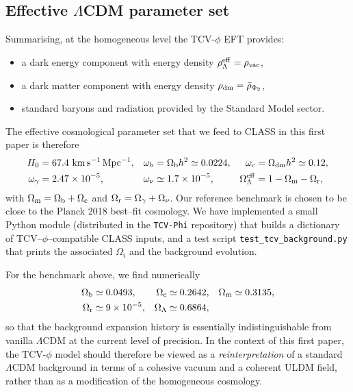 \documentclass[aps,prd,onecolumn,nofootinbib,superscriptaddress]{revtex4-2}
\newcommand{\Omb}{\Omega_{\rm b}}
\newcommand{\Omc}{\Omega_{\rm c}}
\newcommand{\Omm}{\Omega_{\rm m}}
\newcommand{\Oml}{\Omega_{\Lambda}}
\newcommand{\Omg}{\Omega_{\gamma}}
\newcommand{\Omr}{\Omega_{\rm r}}
\begin{document}
\subsection{Effective $\Lambda$CDM parameter set}

Summarising, at the homogeneous level the TCV-$\phi$ EFT provides:
\begin{itemize}[leftmargin=1.5em]
  \item a dark energy component with energy density $\rho_\Lambda^{\rm eff}=\rho_{\rm vac}$,
  \item a dark matter component with energy density $\rho_{\rm dm}=\bar\rho_{\Phi_2}$,
  \item standard baryons and radiation provided by the Standard Model sector.
\end{itemize}
The effective cosmological parameter set that we feed to CLASS in this first paper is therefore
\begin{align}
  H_0 &= 67.4~\mathrm{km\,s^{-1}\,Mpc^{-1}},
  &
  \omega_{\rm b} &= \Omega_{\rm b} h^2 \simeq 0.0224,
  &
  \omega_{\rm c} &= \Omega_{\rm dm} h^2 \simeq 0.12,
  \nonumber\\
  \omega_\gamma &= 2.47\times 10^{-5},
  &
  \omega_\nu &\simeq 1.7\times 10^{-5},
  &
  \Omega_\Lambda^{\rm eff} &= 1 - \Omega_{\rm m} - \Omega_{\rm r},
  \label{eq:theta-tcv}
\end{align}
with $\Omega_{\rm m}=\Omb+\Omc$ and $\Omega_{\rm r}=\Omg+\Omega_\nu$.
Our reference benchmark is chosen to be close to the Planck 2018 best--fit cosmology.
We have implemented a small Python module (distributed in the \texttt{TCV-Phi} repository) that builds a dictionary of TCV--$\phi$--compatible CLASS inputs, and a test script \texttt{test\_tcv\_background.py} that prints the associated $\Omega_i$ and the background evolution.

For the benchmark above, we find numerically
\begin{align}
  \Omb &\simeq 0.0493,
  &
  \Omc &\simeq 0.2642,
  &
  \Omm &\simeq 0.3135,
  \\
  \Omr &\simeq 9\times 10^{-5},
  &
  \Oml &\simeq 0.6864,
\end{align}
so that the background expansion history is essentially indistinguishable from vanilla $\Lambda$CDM at the current level of precision.
In the context of this first paper, the TCV-$\phi$ model should therefore be viewed as a \emph{reinterpretation} of a standard $\Lambda$CDM background in terms of a cohesive vacuum and a coherent ULDM field, rather than as a modification of the homogeneous cosmology.
\end{document}
